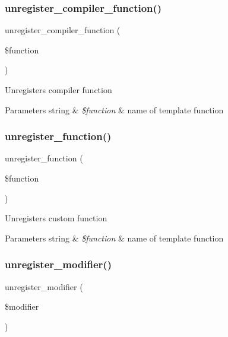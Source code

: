 \subsubsection{\texorpdfstring{unregister\+\_\+compiler\+\_\+function()}{unregister\_compiler\_function()}}
{\footnotesize\ttfamily unregister\+\_\+compiler\+\_\+function (\begin{DoxyParamCaption}\item[{}]{\$function }\end{DoxyParamCaption})}

Unregisters compiler function


\begin{DoxyParams}[1]{Parameters}
string & {\em \$function} & name of template function \\
\hline
\end{DoxyParams}
\mbox{\label{class_smarty_ae73d72302d6bcf8a0b284654b2ecef15}} 
\subsubsection{\texorpdfstring{unregister\+\_\+function()}{unregister\_function()}}
{\footnotesize\ttfamily unregister\+\_\+function (\begin{DoxyParamCaption}\item[{}]{\$function }\end{DoxyParamCaption})}

Unregisters custom function


\begin{DoxyParams}[1]{Parameters}
string & {\em \$function} & name of template function \\
\hline
\end{DoxyParams}
\mbox{\label{class_smarty_aa0efdcad7fc5a36846e5e8bd8a455dd9}} 
\subsubsection{\texorpdfstring{unregister\+\_\+modifier()}{unregister\_modifier()}}
{\footnotesize\ttfamily unregister\+\_\+modifier (\begin{DoxyParamCaption}\item[{}]{\$modifier }\end{DoxyParamCaption})}

